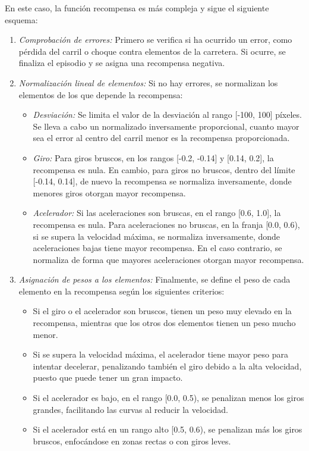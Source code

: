 En este caso, la función recompensa es más compleja y sigue el siguiente esquema:
\begin{enumerate}
\item \textit{Comprobación de errores:} Primero se verifica si ha ocurrido un error, como pérdida del carril o choque contra elementos de la carretera. Si ocurre, se finaliza el episodio y se asigna una recompensa negativa.

\item \textit{Normalización lineal de elementos:} Si no hay errores, se normalizan los elementos de los que depende la recompensa:
\begin{itemize}
\item \textit{Desviación:} Se limita el valor de la desviación al rango [-100, 100] píxeles. Se lleva a cabo un normalizado inversamente proporcional, cuanto mayor sea el error al centro del carril menor es la recompensa proporcionada.
\item \textit{Giro:} Para giros bruscos, en los rangos [-0.2, -0.14] y [0.14, 0.2], la recompensa es nula. En cambio, para giros no bruscos, dentro del límite [-0.14, 0.14], de nuevo la recompensa se normaliza inversamente, donde menores giros otorgan mayor recompensa.
\item \textit{Acelerador:} Si las aceleraciones son bruscas, en el rango [0.6, 1.0], la recompensa es nula. Para aceleraciones no bruscas, en la franja [0.0, 0.6), si se supera la velocidad máxima, se normaliza inversamente, donde aceleraciones bajas tiene mayor recompensa. En el caso contrario, se normaliza de forma que mayores aceleraciones otorgan mayor recompensa.
\end{itemize}

\item \textit{Asignación de pesos a los elementos:} Finalmente, se define el peso de cada elemento en la recompensa según los siguientes criterios:
\begin{itemize}
\item Si el giro o el acelerador son bruscos, tienen un peso muy elevado en la recompensa, mientras que los otros dos elementos tienen un peso mucho menor.
\item Si se supera la velocidad máxima, el acelerador tiene mayor peso para intentar decelerar, penalizando también el giro debido a la alta velocidad, puesto que puede tener un gran impacto.
\item Si el acelerador es bajo, en el rango [0.0, 0.5), se penalizan menos los giros grandes, facilitando las curvas al reducir la velocidad.
\item Si el acelerador está en un rango alto [0.5, 0.6), se penalizan más los giros bruscos, enfocándose en zonas rectas o con giros leves.
\end{itemize}
\end{enumerate}

